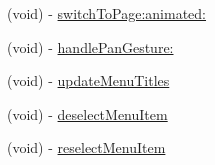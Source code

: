 \begin{DoxyCompactItemize}
\item 
(void) -\/ \mbox{\hyperlink{interface_v_t_magic_view_a419f8745d0c6afd26f97b782a643426e}{switch\+To\+Page\+:animated\+:}}
\item 
(void) -\/ \mbox{\hyperlink{interface_v_t_magic_view_a3c17ac83f0b9c1bf684852d60d3f4766}{handle\+Pan\+Gesture\+:}}
\item 
(void) -\/ \mbox{\hyperlink{interface_v_t_magic_view_a87cfe336988bf4d06aa52c3e1bbef132}{update\+Menu\+Titles}}
\item 
(void) -\/ \mbox{\hyperlink{interface_v_t_magic_view_a0e92cac6b3957cfc432779b9e9fd953f}{deselect\+Menu\+Item}}
\item 
(void) -\/ \mbox{\hyperlink{interface_v_t_magic_view_afd5ddee2cccae141176cd44b737f9444}{reselect\+Menu\+Item}}
\end{DoxyCompactItemize}
